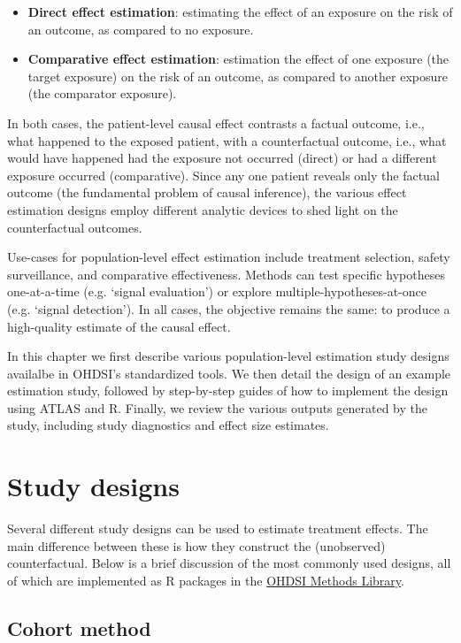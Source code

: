 \documentclass[]{book}
\providecommand{\tightlist}{%
  \setlength{\itemsep}{0pt}\setlength{\parskip}{0pt}}
\begin{document}
\begin{itemize}
\tightlist
\item
  \textbf{Direct effect estimation}: estimating the effect of an
  exposure on the risk of an outcome, as compared to no exposure.
\item
  \textbf{Comparative effect estimation}: estimation the effect of one
  exposure (the target exposure) on the risk of an outcome, as compared
  to another exposure (the comparator exposure).
\end{itemize}

In both cases, the patient-level causal effect contrasts a factual
outcome, i.e., what happened to the exposed patient, with a
counterfactual outcome, i.e., what would have happened had the exposure
not occurred (direct) or had a different exposure occurred
(comparative). Since any one patient reveals only the factual outcome
(the fundamental problem of causal inference), the various effect
estimation designs employ different analytic devices to shed light on
the counterfactual outcomes.

Use-cases for population-level effect estimation include treatment
selection, safety surveillance, and comparative effectiveness. Methods
can test specific hypotheses one-at-a-time (e.g. `signal evaluation') or
explore multiple-hypotheses-at-once (e.g. `signal detection'). In all
cases, the objective remains the same: to produce a high-quality
estimate of the causal effect.

In this chapter we first describe various population-level estimation
study designs availalbe in OHDSI's standardized tools. We then detail
the design of an example estimation study, followed by step-by-step
guides of how to implement the design using ATLAS and R. Finally, we
review the various outputs generated by the study, including study
diagnostics and effect size estimates.

\section{Study designs}\label{study-designs}

Several different study designs can be used to estimate treatment
effects. The main difference between these is how they construct the
(unobserved) counterfactual. Below is a brief discussion of the most
commonly used designs, all of which are implemented as R packages in the
\href{https://ohdsi.github.io/MethodsLibrary/}{OHDSI Methods Library}.

\subsection{Cohort method}\label{CohortMethod}
\end{document}
